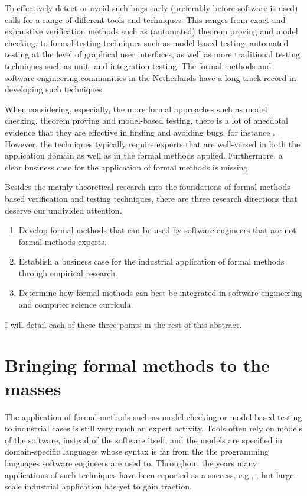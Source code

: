 \documentclass[sigplan]{acmart}\settopmatter{printfolios=true,printccs=false,printacmref=false}
\begin{document}
To effectively detect or avoid such bugs early (preferably before software is
used) calls for a range of different tools and techniques. This ranges from
exact and exhaustive verification methods such as (automated) theorem proving
and model checking, to formal testing techniques such as model based testing,
automated testing at the level of graphical user interfaces, as well as more
traditional testing techniques such as unit- and integration testing.
The formal methods and software engineering communities in the Netherlands have
a long track record in developing such techniques.

When considering, especially, the more formal approaches such as model checking,
theorem proving and model-based testing, there is a lot of anecdotal evidence
that they are effective in finding and avoiding bugs, for instance
\cite{hwong_formalising_2013,Madlener10,fiterau_2016}. However, the techniques
typically require experts that are well-versed in both the application domain as
well as in the formal methods applied. Furthermore, a clear business case for
the application of formal methods is missing.

Besides the mainly theoretical research into the foundations of formal methods
based verification and testing techniques, there are three research directions
that deserve our undivided attention.
\begin{enumerate}
  \item Develop formal methods that can be used by software engineers that are not formal methods experts.
  \item Establish a business case for the industrial application of formal methods through empirical research.
  \item Determine how formal methods can best be integrated in software engineering and computer science curricula. 
\end{enumerate}
I will detail each of these three points in the rest of this abstract.

\section{Bringing formal methods to the masses}

The application of formal methods such as model checking or model based testing
to industrial cases is still very much an expert activity. Tools often rely on
models of the software, instead of the software itself, and the models are
specified in domain-specific languages whose syntax is far from the the
programming languages software engineers are used to. Throughout the years many
applications of such techniques have been reported as a success, e.g.,
\cite{Madlener10,fiterau_2016}, but large-scale
industrial application has yet to gain traction.
\end{document}
